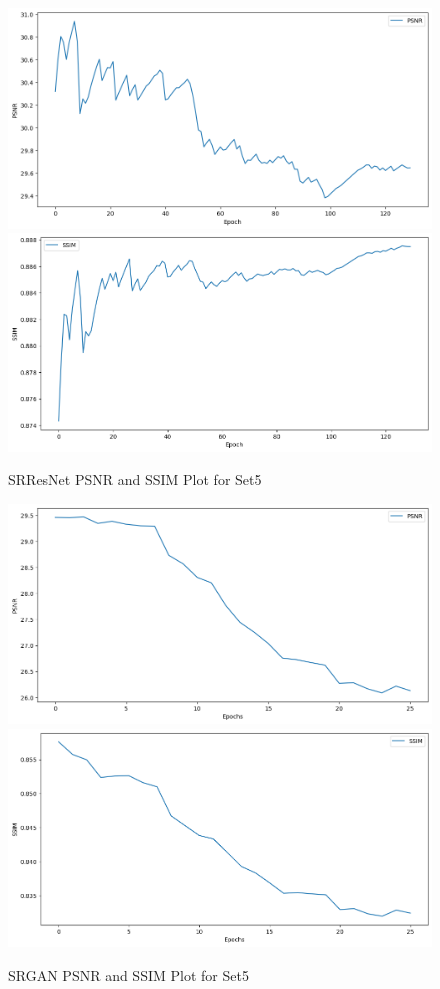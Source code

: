 \begin{figure}[h]
    \centering
    \includegraphics[width=5.5in]{./figures/srresnet_psnr.png}
    \includegraphics[width=5.5in]{./figures/srresnnet_ssim.png}
    \caption{SRResNet PSNR and SSIM Plot for Set5}
\end{figure}  
\begin{figure}[h]
    \centering
    \includegraphics[width=5.5in]{./figures/srgan_psnr.png}
    \includegraphics[width=5.5in]{./figures/srgan_ssim.png}
    \caption{SRGAN PSNR and SSIM Plot for Set5}
\end{figure}  
